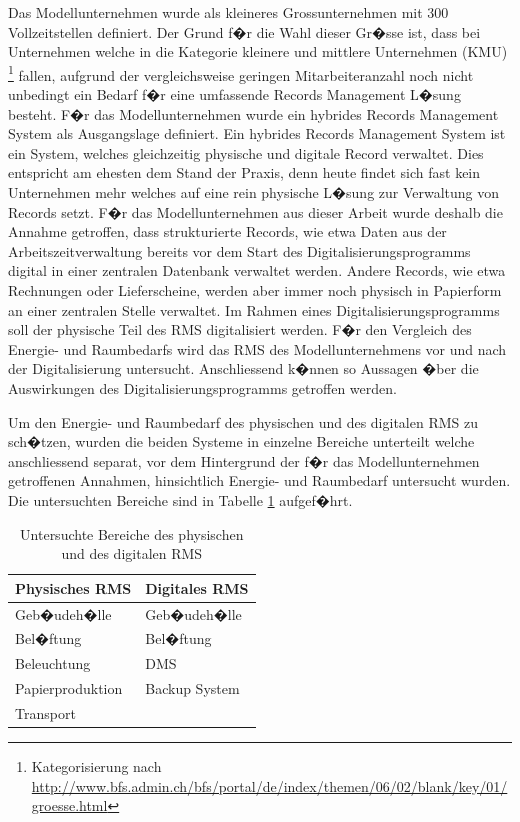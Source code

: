 \documentclass[a4paper,twoside,10pt]{report}
\begin{document}
Das Modellunternehmen wurde als kleineres Grossunternehmen mit 300 Vollzeitstellen definiert. Der Grund f�r die Wahl dieser Gr�sse ist, dass bei Unternehmen welche in die Kategorie kleinere und mittlere Unternehmen (KMU) \footnote{Kategorisierung nach \url{http://www.bfs.admin.ch/bfs/portal/de/index/themen/06/02/blank/key/01/groesse.html}} fallen, aufgrund der vergleichsweise geringen Mitarbeiteranzahl noch nicht unbedingt ein Bedarf f�r eine umfassende Records Management L�sung besteht. F�r das Modellunternehmen wurde ein hybrides Records Management System als Ausgangslage definiert. Ein hybrides Records Management System ist ein System, welches gleichzeitig physische und digitale Record verwaltet. Dies entspricht am ehesten dem Stand der Praxis, denn heute findet sich fast kein Unternehmen mehr welches auf eine rein physische L�sung zur Verwaltung von Records setzt. F�r das Modellunternehmen aus dieser Arbeit wurde deshalb die Annahme getroffen, dass strukturierte Records, wie etwa Daten aus der Arbeitszeitverwaltung bereits vor dem Start des Digitalisierungsprogramms digital in einer zentralen Datenbank verwaltet werden. Andere Records, wie etwa Rechnungen oder Lieferscheine, werden aber immer noch physisch in Papierform an einer zentralen Stelle verwaltet. Im Rahmen eines Digitalisierungsprogramms soll der physische Teil des \ac{RMS} digitalisiert werden. F�r den Vergleich des Energie- und Raumbedarfs wird das \ac{RMS} des Modellunternehmens vor und nach der Digitalisierung untersucht. Anschliessend k�nnen so Aussagen �ber die Auswirkungen des Digitalisierungsprogramms getroffen werden.  \cite{rmHandbook}

Um den Energie- und Raumbedarf des physischen und des digitalen \ac{RMS} zu sch�tzen, wurden die beiden Systeme in einzelne Bereiche unterteilt welche anschliessend separat, vor dem Hintergrund der f�r das Modellunternehmen getroffenen Annahmen, hinsichtlich Energie- und Raumbedarf untersucht wurden. Die untersuchten Bereiche sind in Tabelle \ref{tab:komponenten} aufgef�hrt. 

\begin{table}[htb]
\begin{tabular}{l|l}
	\hline
	\textbf{Physisches RMS} & \textbf{Digitales RMS}\\
	\hline
		Geb�udeh�lle & Geb�udeh�lle \\
		Bel�ftung & Bel�ftung \\
		Beleuchtung & DMS \\
		Papierproduktion	& Backup System \\
		Transport &  \\
	\hline
\end{tabular}
\caption{Untersuchte Bereiche des physischen und des digitalen \ac{RMS}}
\label{tab:komponenten}
\end{table}
\end{document}
